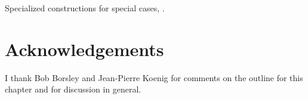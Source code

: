 \documentclass[output=paper]{langsci/langscibook}
\begin{document}
Specialized constructions for special cases, \eg {}.

\section*{Acknowledgements}

I thank Bob Borsley and Jean-Pierre Koenig for comments on the outline for this chapter and for discussion in general.

\printbibliography[heading=subbibliography,notkeyword=this] 
\end{document}
